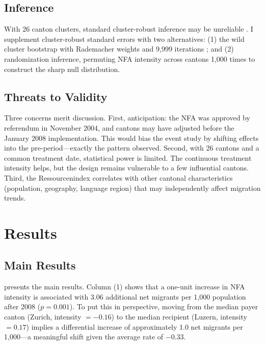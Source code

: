 \documentclass[12pt]{article}
\begin{document}
\subsection{Inference}

With 26 canton clusters, standard cluster-robust inference may be unreliable \citep{CameronGelbachMiller2008}. I supplement cluster-robust standard errors with two alternatives: (1) the wild cluster bootstrap with Rademacher weights and 9,999 iterations \citep{Roodman2019}; and (2) randomization inference, permuting NFA intensity across cantons 1,000 times to construct the sharp null distribution.

\subsection{Threats to Validity}

Three concerns merit discussion. First, anticipation: the NFA was approved by referendum in November 2004, and cantons may have adjusted before the January 2008 implementation. This would bias the event study by shifting effects into the pre-period---exactly the pattern observed. Second, with 26 cantons and a common treatment date, statistical power is limited. The continuous treatment intensity helps, but the design remains vulnerable to a few influential cantons. Third, the Ressourcenindex correlates with other cantonal characteristics (population, geography, language region) that may independently affect migration trends.

\section{Results}

\subsection{Main Results}



 presents the main results. Column (1) shows that a one-unit increase in NFA intensity is associated with 3.06 additional net migrants per 1,000 population after 2008 ($p = 0.001$). To put this in perspective, moving from the median payer canton (Zurich, intensity $= -0.16$) to the median recipient (Luzern, intensity $= 0.17$) implies a differential increase of approximately 1.0 net migrants per 1,000---a meaningful shift given the average rate of $-0.33$.
\end{document}
